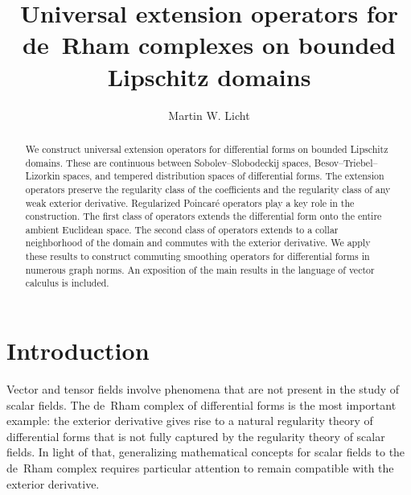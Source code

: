 \documentclass[10pt,a4paper]{amsart}
\theoremstyle{definition}
\theoremstyle{remark}
\numberwithin{equation}{section}
\begin{document}
\title
[Universal extension de~Rham complex]
{Universal extension operators for de~Rham complexes on bounded Lipschitz domains}


\author{Martin W. Licht}
\address{TU Dresden}




\begin{abstract}
    We construct universal extension operators for differential forms on bounded Lipschitz domains. These are continuous between Sobolev--Slobodeckij spaces, Besov--Triebel--Lizorkin spaces, and tempered distribution spaces of differential forms. 
    The extension operators preserve the regularity class of the coefficients and the regularity class of any weak exterior derivative.
    Regularized Poincar\'e operators play a key role in the construction.
    The first class of operators extends the differential form onto the entire ambient Euclidean space. 
    The second class of operators extends to a collar neighborhood of the domain and commutes with the exterior derivative.
    We apply these results to construct commuting smoothing operators for differential forms in numerous graph norms. 
    An exposition of the main results in the language of vector calculus is included. 
\end{abstract}


\maketitle



\tableofcontents



\section{Introduction}



Vector and tensor fields involve phenomena that are not present in the study of scalar fields. 
The de~Rham complex of differential forms is the most important example:
the exterior derivative gives rise to a natural regularity theory of differential forms that is not fully captured by the regularity theory of scalar fields.
In light of that, generalizing mathematical concepts for scalar fields to the de~Rham complex requires particular attention to remain compatible with the exterior derivative. 
\end{document}
